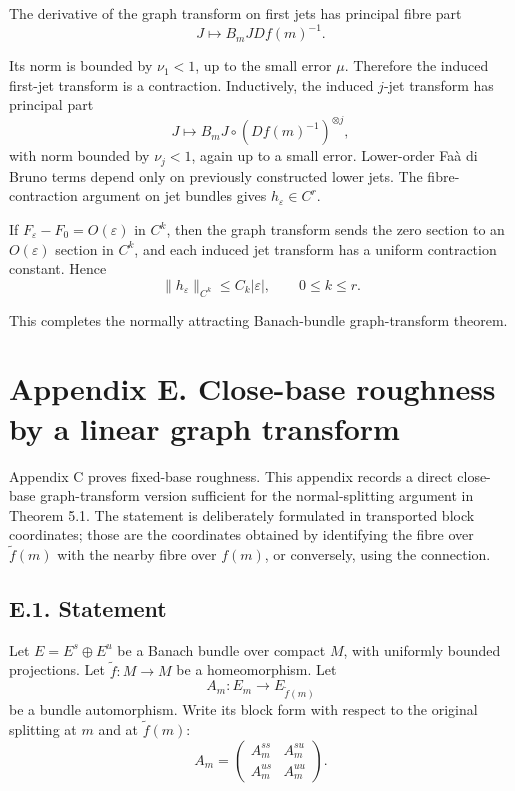 \documentclass[12pt,a4paper]{article}
\theoremstyle{plain}
\numberwithin{equation}{section}
\numberwithin{theorem}{section}
\begin{document}
The derivative of the graph transform on first jets has principal fibre part
\[
J\mapsto B_mJ Df(m)^{-1}.
\]

Its norm is bounded by $\nu_1<1$, up to the small error $\mu$. Therefore the induced first-jet transform is a contraction. Inductively, the induced $j$-jet transform has principal part
\[
J\mapsto B_mJ\circ(Df(m)^{-1})^{\otimes j},
\]
with norm bounded by $\nu_j<1$, again up to a small error. Lower-order Faà di Bruno terms depend only on previously constructed lower jets. The fibre-contraction argument on jet bundles gives $h_\varepsilon\in C^r$.

If $F_\varepsilon-F_0=O(\varepsilon)$ in $C^k$, then the graph transform sends the zero section to an $O(\varepsilon)$ section in $C^k$, and each induced jet transform has a uniform contraction constant. Hence
\[
\|h_\varepsilon\|_{C^k}
\le C_k|\varepsilon|,
\qquad
0\le k\le r.
\]

This completes the normally attracting Banach-bundle graph-transform theorem.

\clearpage

\section{Appendix E. Close-base roughness by a linear graph transform}

Appendix C proves fixed-base roughness. This appendix records a direct close-base graph-transform version sufficient for the normal-splitting argument in Theorem 5.1. The statement is deliberately formulated in transported block coordinates; those are the coordinates obtained by identifying the fibre over $\widetilde f(m)$ with the nearby fibre over $f(m)$, or conversely, using the connection.

\subsection{E.1. Statement}

Let $E=E^s\oplus E^u$ be a Banach bundle over compact $M$, with uniformly bounded projections. Let $\widetilde f:M\to M$ be a homeomorphism. Let
\[
A_m:E_m\to E_{\widetilde f(m)}
\]
be a bundle automorphism. Write its block form with respect to the original splitting at $m$ and at $\widetilde f(m)$:
\[
A_m=
\begin{pmatrix}
A_m^{ss} & A_m^{su}\\
A_m^{us} & A_m^{uu}
\end{pmatrix}.
\]
\end{document}
